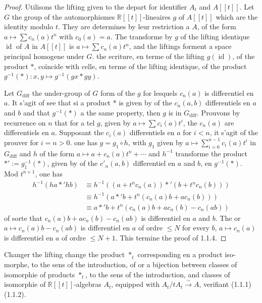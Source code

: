 \documentclass[11pt,a4paper]{article}
\theoremstyle{plain}
\theoremstyle{definition}
\DeclareMathOperator{\id}{id}
\newcommand{\R}{\mathbb{R}}
\newcommand{\iso}{\xrightarrow{\sim}}
\begin{document}
\begin{proof}
Utilisons the lifting given to the depart for identifier $A_{t}$ and $A[[t]]$. Let $G$
the group of the automorphismes $\R[[t]]$-lineaires $g$ of $A[[t]]$ which are the identity modulo
$t$. They are determines by leur restriction a $A$, of the form $a \mapsto \sum c_{n}(a)t^{n}$ with
$c_{0}(a) = a$. The transforme by $g$ of the lifting identique $\id$ of $A$ in $A[[t]]$ is
$a \mapsto \sum c_{n}(a)t^{n}$, and the liftings forment a space principal homogene under $G$.
the ecriture, en terme of the lifting $g(\id)$, of the product $*$, co\"incide with celle, en terme
of the lifting identique, of the product $g^{-1}(*): x, y \mapsto g^{-1}(g x * g y)$.

Let $G_{\text{diff}}$ the under-group of $G$ form of the $g$ for lesquels $c_{n}(a)$ is differentiel en
$a$. It s'agit of see that si a product $*$ is given by of the $c_{n}(a, b)$ differentiels en $a$ and
$b$ and that $g^{-1}(*)$ a the same property, then $g$ is in $G_{\text{diff}}$. Prouvons by recurrence
on $n$ that for a tel $g$, given by $a \mapsto \sum c_{i}(a)t^{i}$, the $c_{n}(a)$ are differentiels en
$a$. Supposant the $c_{i}(a)$ differentiels en $a$ for $i < n$, it s'agit of the prouver for
$i = n > 0$. one has $g = g_{1} \circ h$, with $g_{1}$ given by $a \mapsto \sum_{i=0}^{n-1} c_{i}(a)t^{i}$ in $G_{\text{diff}}$ and $h$ of the form $a \mapsto a + c_{n}(a)t^{n} + \cdots$ and $h^{-1}$ transforme the product $*' := g_{1}^{-1}(*)$, given by of the $c'_{n}(a, b)$ differentiel en $a$ and $b$, en $g^{-1}(*)$. Mod $t^{n+1}$, one has
\begin{align*}
h^{-1}(h a *' h b) &\equiv h^{-1}((a + t^{n}c_{n}(a)) *' (b + t^{n}c_{n}(b))) \\
&\equiv h^{-1}(a *' b + t^{n}(c_{n}(a)b + a c_{n}(b))) \\
&\equiv a *' b + t^{n}(c_{n}(a)b + a c_{n}(b) - c_{n}(ab))
\end{align*}
of sorte that $c_{n}(a)b + a c_{n}(b) - c_{n}(ab)$ is differentiel en $a$ and $b$. The or
$a \mapsto c_{n}(a)b - c_{n}(ab)$ is differentiel en $a$ of ordre $\leq N$ for every $b$,
$a \mapsto c_{n}(a)$ is differentiel en $a$ of ordre $\leq N+1$. This termine the proof of 1.1.4.
\end{proof}

Changer the lifting change the product $*_{t}$ corresponding en a product iso-
morphe, to the sens of the introduction, of or a bijection between classes of isomorphie of
products $*_{t}$, to the sens of the introduction, and classes of isomorphie of $\R[[t]]$-algebras $A_{t}$,
equipped with $A_{t}/tA_{t} \iso A$, verifiant (1.1.1) (1.1.2).
\end{document}
